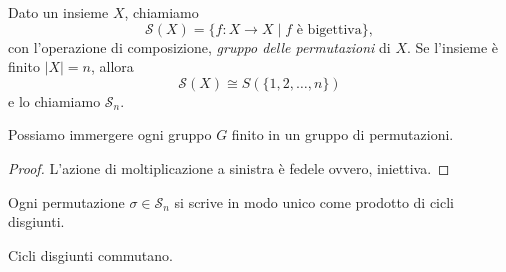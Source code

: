 \begin{multicols}{2}
\begin{definition}
	Dato un insieme $ X $, chiamiamo
	\[  \mathcal{S}(X) = \{ f: X \to X \mid f  \text{ è bigettiva}  \},  \]
	con l'operazione di composizione, \emph{gruppo delle permutazioni} di $ X $. Se l'insieme è finito $ |X| = n $, allora
	\[  \mathcal{S}(X) \cong S(\{ 1 ,2, \dots, n \})  \]
	e lo chiamiamo $ \mathcal{S}_n $.
\end{definition}

\begin{theorem}[Cayley]\label{Cayley}
	Possiamo immergere ogni gruppo $ G $ finito in un gruppo di permutazioni.
\end{theorem}
\begin{proof}
	L'azione di moltiplicazione a sinistra è fedele
	ovvero, iniettiva.
\end{proof}

\begin{prop}[di decomposizione]
	Ogni permutazione $ \sigma \in \mathcal{S}_n $ si scrive in modo unico come prodotto di cicli disgiunti.
\end{prop}
\begin{remark}
	Cicli disgiunti commutano.
\end{remark}



\end{multicols}
